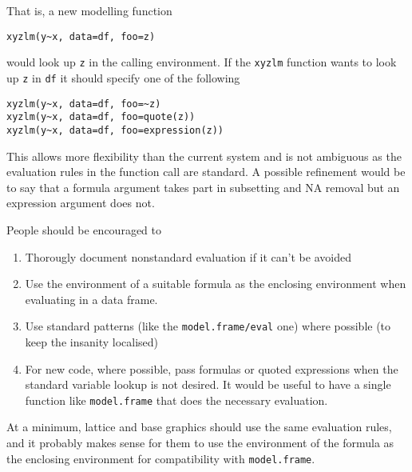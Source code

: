 \documentclass[11pt]{article}
\begin{document}
That is, a new modelling function 
\begin{verbatim}
xyzlm(y~x, data=df, foo=z)
\end{verbatim}
would look up \verb=z= in the calling environment.  If the \texttt{xyzlm} function wants to look up  \verb=z= in \verb=df= it should specify one of the following
\begin{verbatim}
xyzlm(y~x, data=df, foo=~z)
xyzlm(y~x, data=df, foo=quote(z))
xyzlm(y~x, data=df, foo=expression(z))
\end{verbatim}
This allows more flexibility than the current system and is not ambiguous as the evaluation rules in the function call are standard.  A possible refinement would be to say that a formula argument takes part in subsetting and NA removal but an expression argument does not. 

People should be encouraged to 
\begin{enumerate}
\item Thorougly document nonstandard evaluation if it can't be avoided
\item Use the environment of a suitable formula as the enclosing environment when evaluating in a data frame.
\item Use standard patterns (like the  \verb=model.frame/eval= one) where possible  (to keep the insanity localised)
\item For new code, where possible, pass formulas or quoted expressions when the standard variable lookup is not desired. It would be useful to have a single function like \texttt{model.frame} that does the necessary evaluation.
\end{enumerate}

At a minimum, lattice and base graphics should use the same evaluation rules, and it probably makes sense for them to use the  environment of the formula as the enclosing environment for compatibility with \verb=model.frame=.

 
\end{document}
